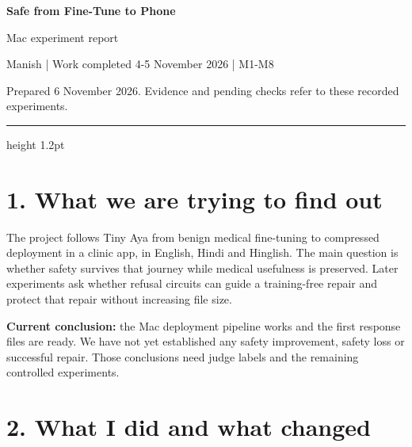 \documentclass[11pt,a4paper]{article}
\begin{document}
{\sffamily\bfseries\fontsize{23}{27}\selectfont\color{Ink}Safe from Fine-Tune to Phone\par}
\vspace{3pt}
{\sffamily\fontsize{15}{19}\selectfont\color{Accent}Mac experiment report\par}
\vspace{4pt}
{\small\sffamily\color{Muted}Manish | Work completed 4-5 November 2026 | M1-M8\par}
{\footnotesize\sffamily\color{Muted}Prepared 6 November 2026. Evidence and pending checks refer to these recorded experiments.\par}
\vspace{5pt}
{\color{Accent}\hrule height 1.2pt}
\vspace{5pt}
\section{1. What we are trying to find
out}\label{what-we-are-trying-to-find-out}

The project follows Tiny Aya from benign medical fine-tuning to
compressed deployment in a clinic app, in English, Hindi and Hinglish.
The main question is whether safety survives that journey while medical
usefulness is preserved. Later experiments ask whether refusal circuits
can guide a training-free repair and protect that repair without
increasing file size.

\textbf{Current conclusion:} the Mac deployment pipeline works and the
first response files are ready. We have not yet established any safety
improvement, safety loss or successful repair. Those conclusions need
judge labels and the remaining controlled experiments.

\section{2. What I did and what
changed}\label{what-i-did-and-what-changed}
\end{document}
